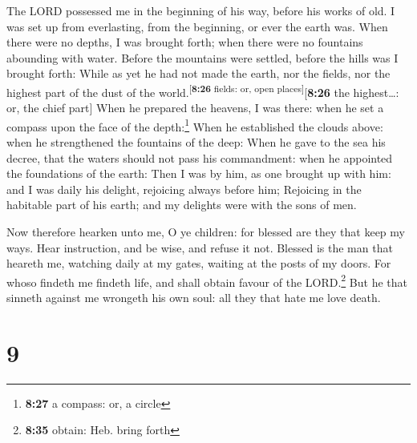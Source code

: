  The LORD possessed me in the beginning of his way,
before his works of old.  I was set up from everlasting,
from the beginning, or ever the earth was.  When there
were no depths, I was brought forth; when there were no fountains
abounding with water.  Before the mountains were settled,
before the hills was I brought forth:  While as yet he
had not made the earth, nor the fields, nor the highest part of the dust
of the world.\textsuperscript{{[}\textbf{8:26} fields: or, open
places{]}}{[}\textbf{8:26} the highest\ldots: or, the chief part{]}
 When he prepared the heavens, I was there: when he set a
compass upon the face of the depth:\footnote{\textbf{8:27} a compass:
  or, a circle}  When he established the clouds above:
when he strengthened the fountains of the deep:  When he
gave to the sea his decree, that the waters should not pass his
commandment: when he appointed the foundations of the earth:
 Then I was by him, as one brought up with him: and I was
daily his delight, rejoicing always before him; 
Rejoicing in the habitable part of his earth; and my delights were with
the sons of men.

 Now therefore hearken unto me, O ye children: for
blessed are they that keep my ways.  Hear instruction,
and be wise, and refuse it not.  Blessed is the man that
heareth me, watching daily at my gates, waiting at the posts of my
doors.  For whoso findeth me findeth life, and shall
obtain favour of the LORD.\footnote{\textbf{8:35} obtain: Heb. bring
  forth}  But he that sinneth against me wrongeth his own
soul: all they that hate me love death.

\hypertarget{section-8}{%
\section{9}\label{section-8}}

